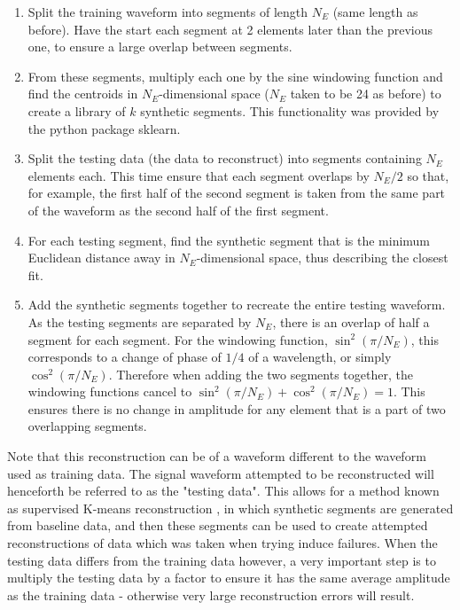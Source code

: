 \begin{enumerate}
    \item Split the training waveform into segments of length $N_E$ (same length as before). Have the start each segment at 2 elements later than the previous one, to ensure a large overlap between segments.
    \item From these segments, multiply each one by the sine windowing function and find the centroids in $N_E$-dimensional space ($N_E$ taken to be 24 as before) to create a library of $k$ synthetic segments. This functionality was provided by the python package sklearn.
    \item Split the testing data (the data to reconstruct) into segments containing $N_E$ elements each. This time ensure that each segment overlaps by $N_E/2$ so that, for example, the first half of the second segment is taken from the same part of the waveform as the second half of the first segment.
    \item For each testing segment, find the synthetic segment that is the minimum Euclidean distance away in $N_E$-dimensional space, thus describing the closest fit. 
    \item Add the synthetic segments together to recreate the entire testing waveform. As the testing segments are separated by $N_E$, there is an overlap of half a segment for each segment. For the windowing function, $\sin^2(\pi/N_E)$, this corresponds to a change of phase of $1/4$ of a wavelength, or simply $\cos^2(\pi/N_E)$. Therefore when adding the two segments together, the windowing functions cancel to $\sin^2(\pi/N_E) + \cos^2(\pi/N_E) = 1$. This ensures there is no change in amplitude for any element that is a part of two overlapping segments.
\end{enumerate}


Note that this reconstruction can be of a waveform different to the waveform used as training data. The signal waveform attempted to be reconstructed will henceforth be referred to as the "testing data". This allows for a method known as supervised K-means reconstruction \cite{596afe3f2b5a4ff3b8f4f9793ad2f4ee}, in which synthetic segments are generated from baseline data, and then these segments can be used to create attempted reconstructions of data which was taken when trying induce failures. When the testing data differs from the training data however, a very important step is to multiply the testing data by a factor to ensure it has the same average amplitude as the training data - otherwise very large reconstruction errors will result.


